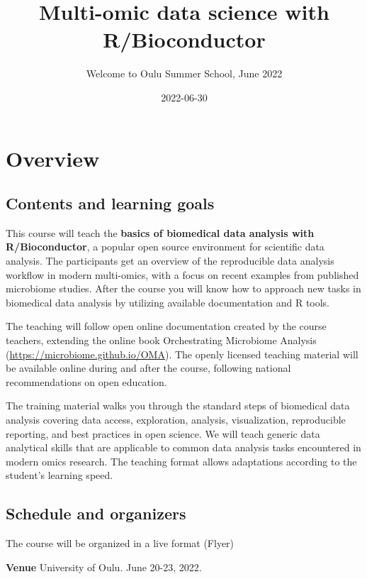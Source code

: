 \documentclass[
  oneside]{book}
\title{Multi-omic data science with R/Bioconductor}
\subtitle{Welcome to Oulu Summer School, June 2022}
\author{}
\date{\vspace{-2.5em}2022-06-30}
\begin{document}
\maketitle

{
\setcounter{tocdepth}{1}
\tableofcontents
}
\hypertarget{overview}{%
\chapter{Overview}\label{overview}}

\hypertarget{contents-and-learning-goals}{%
\section{Contents and learning goals}\label{contents-and-learning-goals}}

This course will teach the \textbf{basics of biomedical data analysis with
R/Bioconductor}, a popular open source environment for scientific
data analysis. The participants get an overview of the reproducible
data analysis workflow in modern multi-omics, with a focus on recent
examples from published microbiome studies. After the course you will
know how to approach new tasks in biomedical data analysis by
utilizing available documentation and R tools.

The teaching will follow open online documentation created by the
course teachers, extending the online book Orchestrating Microbiome
Analysis (\url{https://microbiome.github.io/OMA}). The openly licensed
teaching material will be available online during and after the
course, following national recommendations on open education.

The training material walks you through the standard steps of
biomedical data analysis covering data access, exploration, analysis,
visualization, reproducible reporting, and best practices in open
science. We will teach generic data analytical skills that are
applicable to common data analysis tasks encountered in modern omics
research. The teaching format allows adaptations according to the
student's learning speed.

\hypertarget{schedule-and-organizers}{%
\section{Schedule and organizers}\label{schedule-and-organizers}}

The course will be organized in a live format (Flyer)

\textbf{Venue} University of Oulu. June 20-23, 2022.
\end{document}
